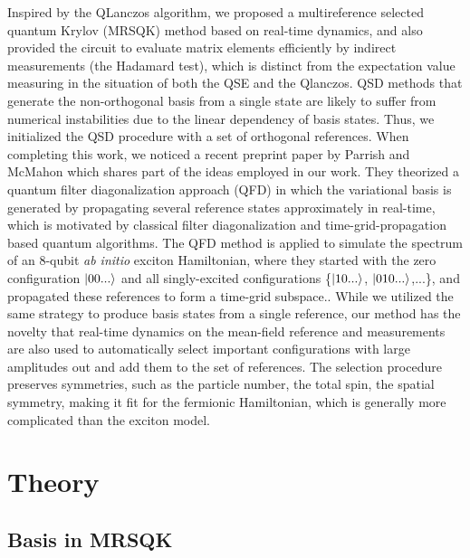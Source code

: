 \documentclass[journal=jctcce,manuscript=article]{achemso}
\newcommand{\methodabbr}[0]{MRSQK\xspace}
\begin{document}
Inspired by the QLanczos algorithm, we proposed a multireference selected quantum Krylov (MRSQK) method\cite{stair2019multireference} based on real-time dynamics, and also provided the circuit to evaluate matrix elements efficiently by indirect measurements (the Hadamard test),\cite{aharonov2009polynomial} which is distinct from the expectation value measuring in the situation of both the QSE\cite{McClean:2017ct} and the Qlanczos.\cite{Motta:2019bu}
QSD methods that generate the non-orthogonal basis from a single state are likely to suffer from numerical instabilities due to the linear dependency of basis states.\cite{Motta:2019bu,Huggins:2019vv} Thus, we initialized the QSD procedure with a set of orthogonal references.
When completing this work, we noticed a recent preprint paper by Parrish and McMahon\cite{Parrish:2019tc} which shares part of the ideas employed in our work. 
They theorized a quantum filter diagonalization approach (QFD) in which the variational basis is generated by propagating several reference states approximately in real-time, which is motivated by classical filter diagonalization\cite{Neuhauser:1994jp,Neuhauser:1990dp,wall1995extraction, mandelshtam1997low} and time-grid-propagation based quantum algorithms.\cite{Somma:2002jo,Somma:2019th,OBrien:2019cw,Kyriienko:2020gg} 
The QFD method is applied to simulate the spectrum of an 8-qubit \textit{ab initio} exciton Hamiltonian, where they started with the zero configuration $\left\vert{00...}\right\rangle$ and all singly-excited configurations \{$\left\vert{10...}\right\rangle$, $\left\vert{010...}\right\rangle$,...\}, and propagated these references to form a time-grid subspace.\cite{Parrish:2019tc}.
While we utilized the same strategy to produce basis states from a single reference, our method has the novelty that real-time dynamics on the mean-field reference and measurements are also used to automatically select important configurations with large amplitudes out and add them to the set of references. The selection procedure preserves symmetries, such as the particle number, the total spin, the spatial symmetry, making it fit for the fermionic Hamiltonian, which is generally more complicated than the exciton model.


\section{Theory}


\subsection{Basis in \methodabbr}
\end{document}
